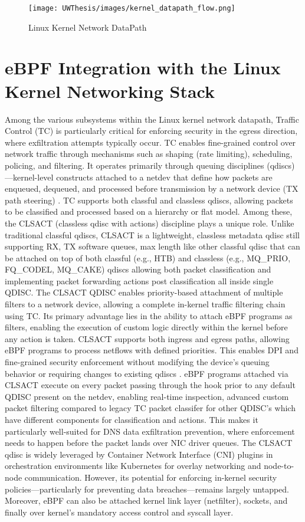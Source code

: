 \documentclass [11pt, proquest] {uwthesis}[2020/02/24]
\begin{document}
\label{sec:kernel-network-datapath}
\begin{figure}[h]
\texttt{[image: UWThesis/images/kernel\_datapath\_flow.png]}
\caption{Linux Kernel Network DataPath}
\end{figure}



\section{eBPF Integration with the Linux Kernel Networking Stack}
Among the various subsystems within the Linux kernel network datapath, Traffic Control (TC) is particularly critical for enforcing security in the egress direction, where exfiltration attempts typically occur. TC enables fine-grained control over network traffic through mechanisms such as shaping (rate limiting), scheduling, policing, and filtering. It operates primarily through queuing disciplines (qdiscs)—kernel-level constructs attached to a netdev that define how packets are enqueued, dequeued, and processed before transmission by a network device (TX path steering) \cite{salim2015linux}.
TC supports both classful and classless qdiscs, allowing packets to be classified and processed based on a hierarchy or flat model. Among these, the CLSACT (classless qdisc with actions) discipline plays a unique role. Unlike traditional classful qdiscs, CLSACT is a lightweight, classless metadata qdisc still supporting RX, TX software queues, max length like other classful qdisc that can be attached on top of both classful (e.g., HTB) and classless (e.g., MQ\_PRIO, FQ\_CODEL, MQ\_CAKE) qdiscs allowing both packet classification and implementing packet forwarding actions post classification all inside single QDISC. The CLSACT QDISC enables priority-based attachment of multiple filters to a network device, allowing a complete in-kernel traffic filtering chain using TC. Its primary advantage lies in the ability to attach eBPF programs as filters, enabling the execution of custom logic directly within the kernel before any action is taken. CLSACT supports both ingress and egress paths, allowing eBPF programs to process netflows with defined priorities. This enables DPI and fine-grained security enforcement without modifying the device’s queuing behavior or requiring changes to existing qdiscs \cite{borkmann2016getting}. 
eBPF programs attached via CLSACT execute on every packet passing through the hook prior to any default QDISC present on the netdev, enabling real-time inspection, advanced custom packet filtering compared to legacy TC packet classifer for other QDISC's which have different components for classification and actions.  This makes it particularly well-suited for DNS data exfiltration prevention, where enforcement needs to happen before the packet lands over NIC driver queues. The CLSACT qdisc is widely leveraged by Container Network Interface (CNI) plugins in orchestration environments like Kubernetes for overlay networking and node-to-node communication. However, its potential for enforcing in-kernel security policies—particularly for preventing data breaches—remains largely untapped. Moreover, eBPF can also be attached kernel link layer (netfilter), sockets, and finally over kernel's mandatory access control and syscall layer. 
\end{document}
